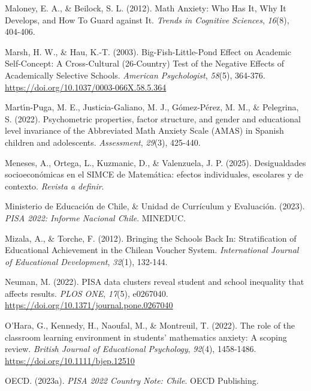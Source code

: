 \documentclass[
  spanish,
  a4paper,
  oneside]{scrbook}
\newlength{\cslhangindent}
\newenvironment{CSLReferences}[2] %
 {\begin{list}{}{%
  \setlength{\itemindent}{0pt}
  \setlength{\leftmargin}{0pt}
  \setlength{\parsep}{0pt}
  \ifodd #1
   \setlength{\leftmargin}{\cslhangindent}
   \setlength{\itemindent}{-1\cslhangindent}
  \fi
  \setlength{\itemsep}{#2\baselineskip}}}
 {\end{list}}
\begin{document}
\begin{CSLReferences}{1}{0}
Maloney, E. A., \& Beilock, S. L. (2012). Math Anxiety: Who Has It, Why
It Develops, and How To Guard against It. \emph{Trends in Cognitive
Sciences}, \emph{16}(8), 404-406.

Marsh, H. W., \& Hau, K.-T. (2003). Big-Fish-Little-Pond Effect on
Academic Self-Concept: A Cross-Cultural (26-Country) Test of the
Negative Effects of Academically Selective Schools. \emph{American
Psychologist}, \emph{58}(5), 364-376.
\url{https://doi.org/10.1037/0003-066X.58.5.364}

Martı́n-Puga, M. E., Justicia-Galiano, M. J., Gómez-Pérez, M. M., \&
Pelegrina, S. (2022). Psychometric properties, factor structure, and
gender and educational level invariance of the Abbreviated Math Anxiety
Scale ({AMAS}) in Spanish children and adolescents. \emph{Assessment},
\emph{29}(3), 425-440.

Meneses, A., Ortega, L., Kuzmanic, D., \& Valenzuela, J. P. (2025).
Desigualdades socioecon{ó}micas en el SIMCE de Matem{á}tica: efectos
individuales, escolares y de contexto. \emph{Revista a definir}.

Ministerio de Educación de Chile, \& Unidad de Currículum y Evaluación.
(2023). \emph{PISA 2022: Informe Nacional Chile}. MINEDUC.

Mizala, A., \& Torche, F. (2012). Bringing the Schools Back In:
Stratification of Educational Achievement in the Chilean Voucher System.
\emph{International Journal of Educational Development}, \emph{32}(1),
132-144.

Neuman, M. (2022). PISA data clusters reveal student and school
inequality that affects results. \emph{PLOS ONE}, \emph{17}(5),
e0267040. \url{https://doi.org/10.1371/journal.pone.0267040}

O'Hara, G., Kennedy, H., Naoufal, M., \& Montreuil, T. (2022). The role
of the classroom learning environment in students' mathematics anxiety:
A scoping review. \emph{British Journal of Educational Psychology},
\emph{92}(4), 1458-1486. \url{https://doi.org/10.1111/bjep.12510}

OECD. (2023a). \emph{PISA 2022 Country Note: Chile}. OECD Publishing.


\end{CSLReferences}
\end{document}
